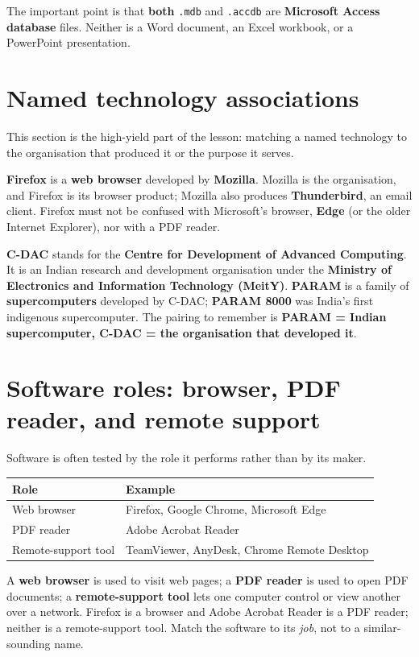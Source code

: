 \documentclass[11pt]{article}
\begin{document}
The important point is that \textbf{both} \texttt{.mdb} and \texttt{.accdb}
are \textbf{Microsoft Access database} files. Neither is a Word document, an
Excel workbook, or a PowerPoint presentation.

\section{Named technology associations}
This section is the high-yield part of the lesson: matching a named
technology to the organisation that produced it or the purpose it serves.

\textbf{Firefox} is a \textbf{web browser} developed by \textbf{Mozilla}.
Mozilla is the organisation, and Firefox is its browser product; Mozilla also
produces \textbf{Thunderbird}, an email client. Firefox must not be confused
with Microsoft's browser, \textbf{Edge} (or the older Internet Explorer), nor
with a PDF reader.

\textbf{C-DAC} stands for the \textbf{Centre for Development of Advanced
Computing}. It is an Indian research and development organisation under the
\textbf{Ministry of Electronics and Information Technology (MeitY)}.
\textbf{PARAM} is a family of \textbf{supercomputers} developed by C-DAC;
\textbf{PARAM 8000} was India's first indigenous supercomputer. The pairing
to remember is \textbf{PARAM = Indian supercomputer, C-DAC = the organisation
that developed it}.

\section{Software roles: browser, PDF reader, and remote support}
Software is often tested by the role it performs rather than by its maker.

\begin{center}
\begin{tabular}{p{}p{}}
\toprule
\textbf{Role} & \textbf{Example} \\
\midrule
Web browser & Firefox, Google Chrome, Microsoft Edge \\
PDF reader & Adobe Acrobat Reader \\
Remote-support tool & TeamViewer, AnyDesk, Chrome Remote Desktop \\
\bottomrule
\end{tabular}
\end{center}

A \textbf{web browser} is used to visit web pages; a \textbf{PDF reader} is
used to open PDF documents; a \textbf{remote-support tool} lets one computer
control or view another over a network. Firefox is a browser and Adobe
Acrobat Reader is a PDF reader; neither is a remote-support tool. Match the
software to its \emph{job}, not to a similar-sounding name.
\end{document}
